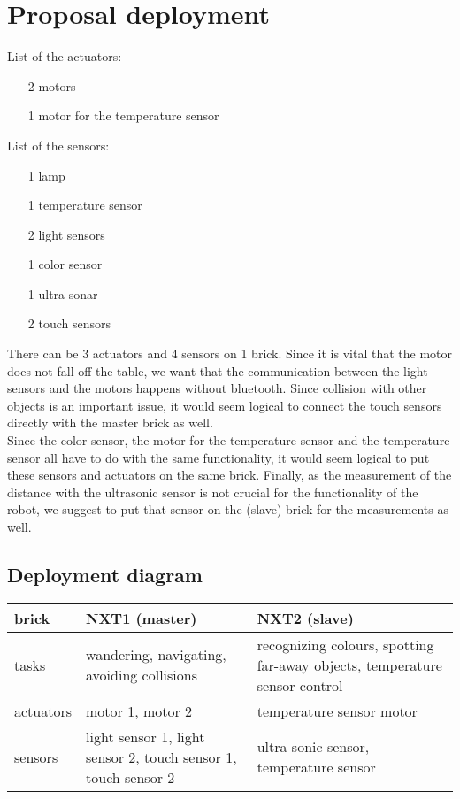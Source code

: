\documentclass[10pt,a4paper]{article}
\begin{document}
\section*{Proposal deployment}
List of the actuators:
\begin{itemize}
\item[2] motors
\item[1] motor for  the temperature sensor
\end{itemize}

\noindent List of the sensors:
\begin{itemize}
\item[1] lamp
\item[1] temperature sensor
\item[2] light sensors
\item[1] color sensor
\item[1] ultra sonar
\item[2] touch sensors
\end{itemize}

There can be 3 actuators and 4 sensors on 1 brick.
Since it is vital that the motor does not fall off the table, we want that the communication between the light sensors and the motors happens without bluetooth. Since collision with other objects is an important issue, it would seem logical to connect the touch sensors directly with the master brick as well.\\ 

Since the color sensor, the motor for the temperature sensor and the temperature sensor all have to do with the same functionality, it would seem logical to put these sensors and actuators on the same brick. Finally, as the measurement of the distance with the ultrasonic sensor is not crucial for the functionality of the robot, we suggest to put that sensor on the (slave) brick for the measurements as well.\\

\subsection*{Deployment diagram}
\begin{tabular}{|p{3cm}|p{6cm}|p{6cm}|} 
\hline
brick & NXT1 (master) & NXT2 (slave)\\
\hline
tasks & wandering, navigating, avoiding collisions & recognizing colours, spotting far-away objects, temperature sensor control\\\hline
actuators & motor 1, motor 2 & temperature sensor motor\\\hline
sensors & light sensor 1, light sensor 2, touch sensor 1, touch sensor 2 & ultra sonic sensor, temperature sensor\\
\hline
\end{tabular}
\end{document}

